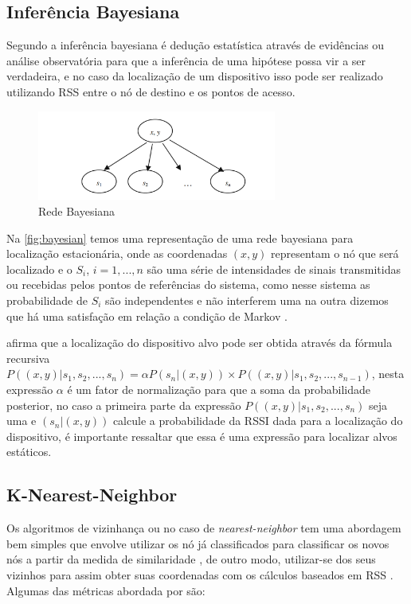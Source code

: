     \subsection{Inferência Bayesiana}
  Segundo  a inferência bayesiana é dedução estatística através de evidências ou análise observatória para que a inferência de uma hipótese possa vir a ser verdadeira, e no caso da localização de um dispositivo isso pode ser realizado utilizando RSS entre o nó de destino e os pontos de acesso.


    \begin{figure}[H]
              \caption{\label{fig:bayesian}{Rede Bayesiana}}
              \centering
              \includegraphics[width=0.7\textwidth]{Figuras/bayesian_network.PNG}
        \end{figure}

        Na \autoref{fig:bayesian} temos uma representação de uma rede bayesiana para localização estacionária, onde as coordenadas $(x,y)$ representam o nó que será localizado e o $S_i$, $i=1,...,n$ são uma série de intensidades de sinais transmitidas ou recebidas pelos pontos de referências do sistema, como nesse sistema as probabilidade de $S_i$ são independentes e não interferem uma na outra dizemos que há uma satisfação em relação a condição de Markov \cite{rfid2009review}.
        \par
         afirma que a localização do dispositivo alvo pode ser obtida através da fórmula recursiva
        $P((x,y) | s_1, s_2, ..., s_n) = \alpha P(s_n | (x,y)) \times P((x,y) | s_1,s_2, ...,s_{n-1})$, nesta expressão $\alpha$ é um fator de normalização para que a soma da probabilidade posterior, no caso a primeira parte da expressão $P((x,y) | s_1, s_2, ..., s_n)$ seja uma e $(s_n | (x,y))$ calcule a probabilidade da RSSI dada para a localização do dispositivo, é importante ressaltar que essa é uma expressão para localizar alvos estáticos.
        
    \subsection{K-Nearest-Neighbor}
    Os algoritmos de vizinhança ou no caso de \textit{nearest-neighbor} tem uma abordagem bem simples que envolve
    utilizar os nó já classificados para classificar os novos nós a partir da medida de similaridade \cite{knn-3dLAN},
    de outro modo, utilizar-se dos seus vizinhos para assim obter suas coordenadas com os cálculos baseados em RSS \cite{rfid2009review}.
    Algumas das métricas abordada por  são:

